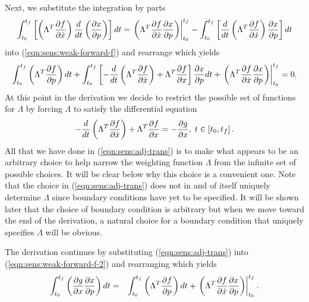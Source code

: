 \documentclass[pdf,ps2pdf,11pt]{SANDreport}
\begin{document}
Next, we substitute the integration by parts
%
\begin{equation}
\int_{t_0}^{t_f} \left[ \left( \Lambda^T \displaystyle{\frac{\partial f}{\partial \dot{x}}} \right) \frac{d}{dt}\left( \displaystyle{\frac{\partial x}{\partial p}} \right) \right] dt
= \left. \left( \Lambda^T \displaystyle{\frac{\partial f}{\partial \dot{x}}} \displaystyle{\frac{\partial x}{\partial p}} \right) \right|_{t_0}^{t_f}
- \int_{t_0}^{t_f} \left[ \frac{d}{dt}\left( \Lambda^T \displaystyle{\frac{\partial f}{\partial \dot{x}}} \right) \displaystyle{\frac{\partial x}{\partial p}} \right] dt
\end{equation}
%
into (\ref{eqn:sens:weak-forward-f}) and rearrange which yields
%
\begin{equation}
\int_{t_0}^{t_f} \left( \Lambda^T \displaystyle{\frac{\partial f}{\partial p}} \right) dt
+ \int_{t_0}^{t_f} \left[
    - \frac{d}{dt}\left( \Lambda^T \displaystyle{\frac{\partial f}{\partial \dot{x}}} \right)
    + \Lambda^T \displaystyle{\frac{\partial f}{\partial x}}
  \right] \displaystyle{\frac{\partial x}{\partial p}} dt
+ \left. \left( \Lambda^T \displaystyle{\frac{\partial f}{\partial \dot{x}}} \displaystyle{\frac{\partial x}{\partial p}} \right) \right|_{t_0}^{t_f}
= 0.
\label{eqn:sens:weak-forward-f-2}
\end{equation}
%
At this point in the derivation we decide to restrict the possible set of
functions for $\Lambda$ by forcing $\Lambda$ to satisfy the differential
equation
%
\begin{equation}
- \frac{d}{dt}\left( \Lambda^T \displaystyle{\frac{\partial f}{\partial \dot{x}}} \right)
+  \Lambda^T \displaystyle{\frac{\partial f}{\partial x}} = - \displaystyle{\frac{\partial g}{\partial x}}, \; t \in \left[ t_0, t_f \right].
\label{eqn:sens:adj-trans}
\end{equation}
%
All that we have done in (\ref{eqn:sens:adj-trans}) is to make what appears to
be an arbitrary choice to help narrow the weighting function $\Lambda$ from
the infinite set of possible choices.  It will be clear below why this choice
is a convenient one.  Note that the choice in (\ref{eqn:sens:adj-trans}) does
not in and of itself uniquely determine $\Lambda$ since boundary conditions
have yet to be specified.  It will be shown later that the choice of boundary
condition is arbitrary but when we move toward the end of the derivation, a
natural choice for a boundary condition that uniquely specifies $\Lambda$ will
be obvious.

The derivation continues by substituting
(\ref{eqn:sens:adj-trans}) into
(\ref{eqn:sens:weak-forward-f-2}) and rearranging which yields
%
\begin{eqnarray}
\int_{t_0}^{t_f} \left( \displaystyle{\frac{\partial g}{\partial x}} \displaystyle{\frac{\partial x}{\partial p}} \right) dt
& = &  \int_{t_0}^{t_f} \left( \Lambda^T \displaystyle{\frac{\partial f}{\partial p}} \right) dt
+ \left. \left( \Lambda^T \displaystyle{\frac{\partial f}{\partial \dot{x}}} \displaystyle{\frac{\partial x}{\partial p}} \right) \right|^{t_f}_{t_0}.
\label{eqn:sens:weak-forward-f-3}
\end{eqnarray}
\end{document}
